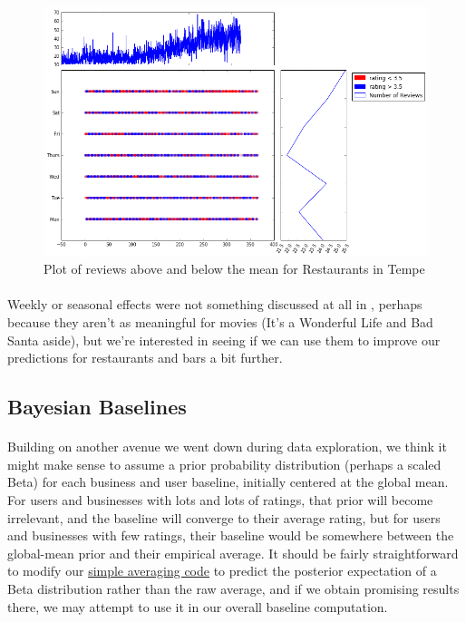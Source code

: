 \documentclass[11pt]{article}
\begin{document}
\begin{figure}[H]
\centering
\includegraphics[keepaspectratio=true,scale=0.4]{./images/tempe_restaurants}
\caption{Plot of reviews above and below the mean for Restaurants in Tempe}\label{fg:tempe}
\end{figure}

\paragraph{} Weekly or seasonal effects were not something discussed at all in \cite{koren}, perhaps because they aren't as meaningful for movies (It's a Wonderful Life and Bad Santa aside), but we're interested in seeing if we can use them to improve our predictions for restaurants and bars a bit further.

\subsection*{Bayesian Baselines}

\paragraph{} Building on another avenue we went down during data exploration, we think it might make sense to assume a prior probability distribution (perhaps a scaled Beta) for each business and user baseline, initially centered at the global mean. For users and businesses with lots and lots of ratings, that prior will become irrelevant, and the baseline will converge to their average rating, but for users and businesses with few ratings, their baseline would be somewhere between the global-mean prior and their empirical average. It should be fairly straightforward to modify our \href{https://github.com/NickHoernle/Data-Science-Project-AM209a/blob/master/util/simple_averaging_recommender.py}{simple averaging code} to predict the posterior expectation of a Beta distribution rather than the raw average, and if we obtain promising results there, we may attempt to use it in our overall baseline computation.
\end{document}
